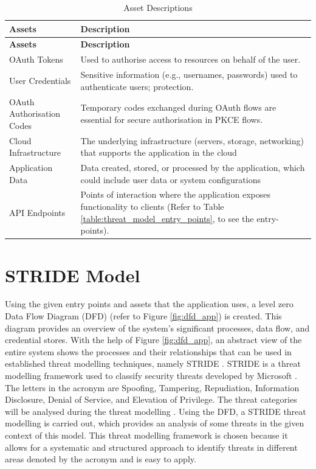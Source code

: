 \begin{longtable}{|p{8cm}|p{8cm}|}
\caption{Asset Descriptions}
\label{table:threat_model_assets}
\hline
\rowcolor{grey!15}
\textbf{Assets} & \textbf{Description} \\
\hline
\endfirsthead

\hline
\rowcolor{grey!15}
\textbf{Assets} & \textbf{Description} \\
\hline
\endhead

OAuth Tokens & Used to authorise access to resources on behalf of the user. \\
\hline
User Credentials & Sensitive information (e.g., usernames, passwords) used to authenticate users; protection. \\
\hline
OAuth Authorisation Codes & Temporary codes exchanged during OAuth flows are essential for secure authorisation in PKCE flows. \\
\hline
Cloud Infrastructure & The underlying infrastructure (servers, storage, networking) that supports the application in the cloud \\
\hline
Application Data & Data created, stored, or processed by the application, which could include user data or system configurations \\
\hline
API Endpoints & Points of interaction where the application exposes functionality to clients (Refer to Table \ref{table:threat_model_entry_points}, to see the entry-points). \\
\hline

\end{longtable}


\section{STRIDE Model}
Using the given entry points and assets that the application uses, a level zero Data Flow Diagram (DFD) (refer to Figure \ref{fig:dfd_app}) is created. This diagram provides an overview of the system's significant processes, data flow, and credential stores. With the help of Figure \ref{fig:dfd_app}, an abstract view of the entire system shows the processes and their relationships that can be used in established threat modelling techniques, namely STRIDE \citep{dfd_stride}. STRIDE is a threat modelling framework used to classify security threats developed by Microsoft \citep{stride_usage}. The letters in the acronym are Spoofing, Tampering, Repudiation, Information Disclosure, Denial of Service, and Elevation of Privilege. The threat categories will be analysed during the threat modelling \citep{stride}. Using the DFD, a STRIDE threat modelling is carried out, which provides an analysis of some threats in the given context of this model. This threat modelling framework is chosen because it allows for a systematic and structured approach to identify threats in different areas denoted by the acronym and is easy to apply.



